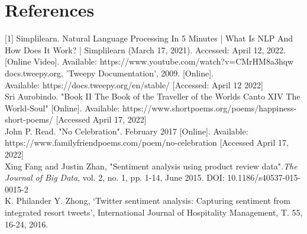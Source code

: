 \documentclass[]{article}
\begin{document}
    \section{References}
    [1] Simplilearn. Natural Language Processing In 5 Minutes | What Is NLP And How Does It Work? | Simplilearn (March 17, 2021).
    Accessed: April 12, 2022. [Online Video]. Available: https://www.youtube.com/watch?v=CMrHM8a3hqw\\

    \noindent[2] docs.tweepy.org, 'Tweepy Documentation', 2009. [Online].\\ Available: https://docs.tweepy.org/en/stable/  [Accessed: April 12 2022]\\

    \noindent[3] Sri Aurobindo. "Book II The Book of the Traveller of the Worlds Canto XIV The World-Soul" [Online]. Available: https://www.shortpoems.org/poems/happiness-short-poems/ [Accessed April 17, 2022]\\

    \noindent[4] John P. Read. "No Celebration". February 2017 [Online]. Available: https://www.familyfriendpoems.com/poem/no-celebration [Accessed April 17, 2022]\\

    \noindent[5] Xing Fang and Justin Zhan, "Sentiment analysis using product review data".\textit{The Journal of Big Data}, vol. 2, no. 1, pp. 1-14, June 2015.
    DOI: 10.1186/s40537-015-0015-2\\

    \noindent[6] K. Philander Y. Zhong, `Twitter sentiment analysis: Capturing sentiment from integrated resort tweets', International Journal of Hospitality Management, T. 55,  16-24, 2016.






    
\end{document}

